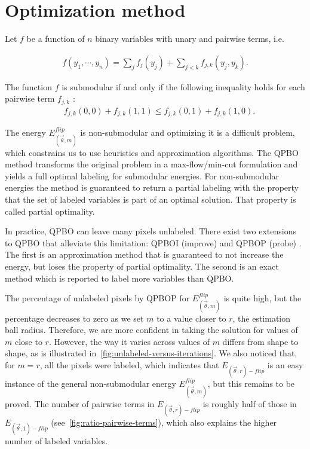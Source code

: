 

\section{Optimization method}
\label{ch7:sec:optimization-method}

Let $f$ be a function of $n$ binary variables with unary and pairwise terms, i.e.

\begin{align*}
f(y_1,\cdots, y_n) = \sum_{j}{f_j(y_j)} + \sum_{j < k}{f_{j,k}(y_j,y_k)}.
\end{align*}

The function $f$ is submodular if and only if the following inequality holds for each pairwise term $f_{j,k}$ \cite{kolmogorov04whatenergies}:
\begin{align*}
  \quad f_{j,k}(0,0) + f_{j,k}(1,1) \leq f_{j,k}(0,1) + f_{j,k}(1,0).
\end{align*}

The energy $E_{(\vec{\theta},m)}^{flip}$ is non-submodular and optimizing it is a difficult problem, which constrains us to use heuristics and
approximation algorithms. The QPBO method \cite{hammer84} transforms the original problem in a max-flow/min-cut
formulation and yields a full optimal labeling for submodular energies. For non-submodular energies the method is
guaranteed to return a partial labeling with the property that the set of labeled variables is part of an optimal
solution. That property is called partial optimality.

In practice, QPBO can leave many pixels unlabeled. There exist two extensions to QPBO that alleviate this limitation:
QPBOI (improve) and QPBOP (probe) \cite{rother07qpbo}. The first is an approximation method that is guaranteed to not increase the energy,
but loses the property of partial optimality. The second is an exact method which is reported to label more variables
than QPBO.

The percentage of unlabeled pixels by QPBOP for $E_{(\vec{\theta},m)}^{flip}$ is quite high, but the percentage decreases to zero as we set $m$
to a value closer to $r$, the estimation ball radius. Therefore, we are more confident in taking the solution for values of $m$ close to $r$. However, the way it
varies across values of $m$ differs from shape to shape, as is illustrated in~\cref{fig:unlabeled-versus-iterations}. We also noticed that, for $m=r$, all the pixels were labeled, which
  indicates that $E_{(\vec{\theta},r)-flip}$ is an easy instance of the general non-submodular energy $E_{(\vec{\theta},m)}^{flip}$, but this remains to be
  proved. The number of pairwise terms in $E_{(\vec{\theta},r)-flip}$ is roughly half of those in $E_{(\vec{\theta},1)-flip}$ (see~\cref{fig:ratio-pairwise-terms}), which also explains the higher number of labeled variables.

